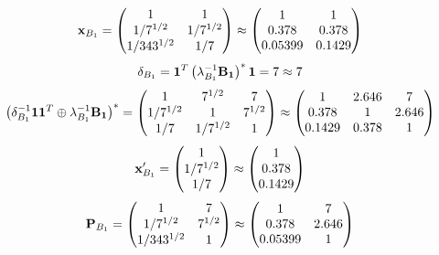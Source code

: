 \documentclass[10pt,a4paper]{article}
\begin{document}
	\[
		\bold{x}_{B_1} = 
		\begin{pmatrix}
			{1}{} & {1}{} \\
			{1} / {{7^ {1 / 2}}} & {1} / {{7^ {1 / 2}}} \\
			{1} / {{343^ {1 / 2}}} & {1} / {{7}} \\
		\end{pmatrix}
		\approx
		\begin{pmatrix}
			1        & 1        \\
			0.378    & 0.378    \\
			0.05399  & 0.1429   \\
		\end{pmatrix}
	\]
	\[
		\delta_{B_1} = \bold{1}^T \left(\lambda_{B_1}^{-1}\bold{B_1}\right)^* \bold{1} = {{7}}{}\approx 7
	\]
	\[
		\left(\delta_{B_1}^{-1}\bold{11}^T \oplus \lambda_{B_1}^{-1}\bold{B_1}\right)^* = 
		\begin{pmatrix}
			{1}{} & {{7^ {1 / 2}}}{} & {{7}}{} \\
			{1} / {{7^ {1 / 2}}} & {1}{} & {{7^ {1 / 2}}}{} \\
			{1} / {{7}} & {1} / {{7^ {1 / 2}}} & {1}{} \\
		\end{pmatrix}
		\approx
		\begin{pmatrix}
			1        & 2.646    & 7        \\
			0.378    & 1        & 2.646    \\
			0.1429   & 0.378    & 1        \\
		\end{pmatrix}
	\]
	\[
		\bold{x}'_{B_1} = 
		\begin{pmatrix}
			{1}{} \\
			{1} / {{7^ {1 / 2}}} \\
			{1} / {{7}} \\
		\end{pmatrix}
		\approx
		\begin{pmatrix}
			1        \\
			0.378    \\
			0.1429   \\
		\end{pmatrix}
	\]
	\[
		\bold{P}_{B_1} = 
		\begin{pmatrix}
			{1}{} & {{7}}{} \\
			{1} / {{7^ {1 / 2}}} & {{7^ {1 / 2}}}{} \\
			{1} / {{343^ {1 / 2}}} & {1}{} \\
		\end{pmatrix}
		\approx
		\begin{pmatrix}
			1        & 7        \\
			0.378    & 2.646    \\
			0.05399  & 1        \\
		\end{pmatrix}
	\]
\end{document}

